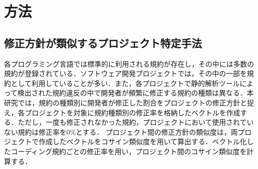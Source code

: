 \documentclass[uplatex,dvipdfmx,a4paper,twocolumn,base=10.5pt,jbase=10.5pt,ja=standard]{bxjsarticle}  %
\newcommand{\todo}[1]{\colorbox{yellow}{{\bf TODO}:}{\color{red} {\textbf{[#1]}}}}
\begin{document}




\section{方法}
\subsection{修正方針が類似するプロジェクト特定手法}
\vspace{2mm}

各プログラミング言語では標準的に利用される規約が存在し，その中には多数の規約が登録されている．ソフトウェア開発プロジェクトでは，その中の一部を規約として利用していることが多い．また，各プロジェクトで静的解析ツールによって検出された規約違反の中で開発者が頻繁に修正する規約の種類は異なる．本研究では，規約の種類別に開発者が修正した割合をプロジェクトの修正方針と捉え，各プロジェクトを対象に規約種類別の修正率を格納したベクトルを作成する．ただし，一度も修正されなかった規約，プロジェクトにおいて使用されていない規約は修正率を0\%とする．
プロジェクト間の修正方針の類似度は，両プロジェクトで作成したベクトルをコサイン類似度を用いて算出する．ベクトル化したコーディング規約ごとの修正率を用い，プロジェクト間のコサイン類似度を計算する．
\end{document}
